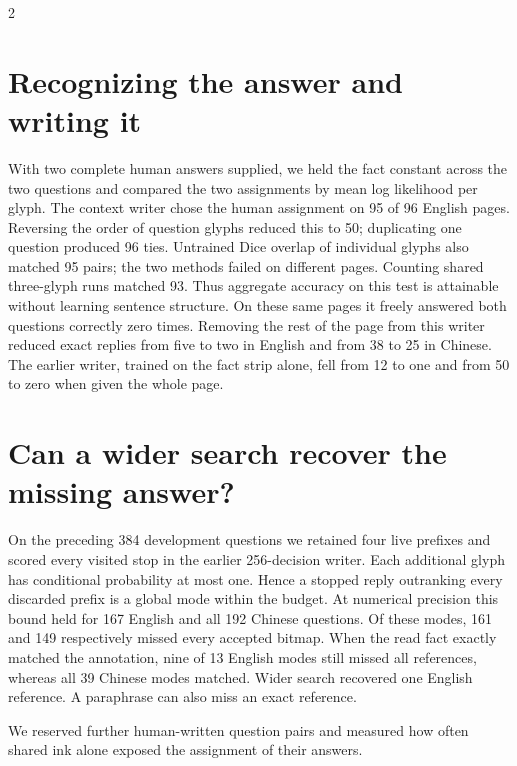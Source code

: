 \begin{multicols}{2}
\section*{Recognizing the answer and writing it}
With two complete human answers supplied, we held the fact constant across the two questions and compared the two assignments by mean log likelihood per glyph. The context writer chose the human assignment on 95 of 96 English pages. Reversing the order of question glyphs reduced this to 50; duplicating one question produced 96 ties. Untrained Dice overlap of individual glyphs also matched 95 pairs; the two methods failed on different pages. Counting shared three-glyph runs matched 93. Thus aggregate accuracy on this test is attainable without learning sentence structure. On these same pages it freely answered both questions correctly zero times. Removing the rest of the page from this writer reduced exact replies from five to two in English and from 38 to 25 in Chinese. The earlier writer, trained on the fact strip alone, fell from 12 to one and from 50 to zero when given the whole page.
\section*{Can a wider search recover the missing answer?}
On the preceding 384 development questions we retained four live prefixes and scored every visited stop in the earlier 256-decision writer. Each additional glyph has conditional probability at most one. Hence a stopped reply outranking every discarded prefix is a global mode within the budget. At numerical precision this bound held for 167 English and all 192 Chinese questions. Of these modes, 161 and 149 respectively missed every accepted bitmap. When the read fact exactly matched the annotation, nine of 13 English modes still missed all references, whereas all 39 Chinese modes matched. Wider search recovered one English reference. A paraphrase can also miss an exact reference.
\end{multicols}
\newpage
{}
\noindent We reserved further human-written question pairs and measured how often shared ink alone exposed the assignment of their answers.

